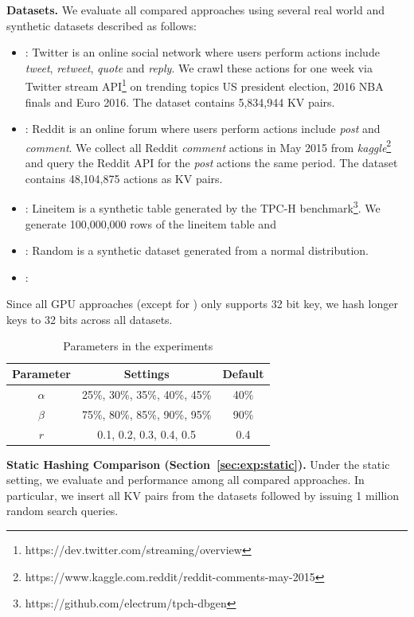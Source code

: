 \vspace{1mm}\noindent\textbf{Datasets.} We evaluate all compared approaches using several real world and synthetic datasets described as follows:
\begin{itemize}
	\item \dstwitter: Twitter is an online social network where users perform actions include \emph{tweet}, \emph{retweet}, \emph{quote} and \emph{reply}.
	We crawl these actions for one week via Twitter stream API\footnote{https://dev.twitter.com/streaming/overview} on trending topics US president election, 2016 NBA finals and Euro 2016. The dataset contains 5,834,944 KV pairs.
	\item \dsreddit: Reddit is an online forum where users perform actions include \emph{post} and \emph{comment}. We collect all Reddit \emph{comment} actions in May 2015 from \emph{kaggle}\footnote{https://www.kaggle.com.reddit/reddit-comments-may-2015} and query the Reddit API for the \emph{post} actions the same period. The dataset contains 48,104,875 actions as KV pairs. 
 	\item \dstpch: Lineitem is a synthetic table generated by the TPC-H benchmark\footnote{https://github.com/electrum/tpch-dbgen}. We generate  100,000,000 rows of the lineitem table and 
	\item \dsrandom: Random is a synthetic dataset generated from a normal distribution. 
	\item \dsali: 
\end{itemize}
Since all GPU approaches (except for \voter) only supports 32 bit key, we hash longer keys to 32 bits across all datasets. 


\begin{table}
	\centering
	\caption{Parameters in the experiments}
	\label{tbl:parameters}
	\begin{tabular}{|c|c|c|}
		\hline
		\textbf{Parameter} & \textbf{Settings} & \textbf{Default} \\ \hline
		$\alpha$ & 25\%, 30\%, 35\%, 40\%, 45\% & 40\% \\ \hline
		$\beta$  & 75\%, 80\%, 85\%, 90\%, 95\% & 90\% \\ \hline
		$r$ & 0.1, 0.2, 0.3, 0.4, 0.5 & 0.4 \\ \hline
	\end{tabular}
\end{table}

\vspace{1mm}\noindent\textbf{Static Hashing Comparison (Section~\ref{sec:exp:static}).}
Under the static setting, we evaluate  and  performance among all compared approaches. 
In particular, we insert all KV pairs from the datasets followed by issuing 1 million random search queries. 


